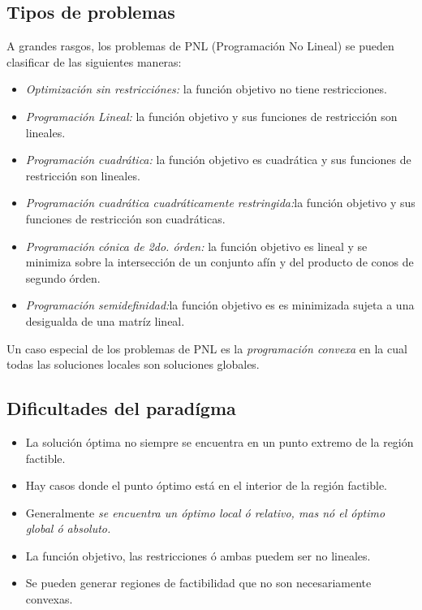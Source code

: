 \documentclass[letterpaper, 12pt]{article}
\begin{document}
    \subsection{Tipos de problemas}
    A grandes rasgos, los problemas de PNL (Programación No Lineal) se pueden clasificar de las siguientes maneras:
    \begin{itemize}
        \item \emph{Optimización sin restricciónes:} la función objetivo no tiene restricciones.
        \item \emph{Programación Lineal: }la función objetivo y sus funciones de restricción son lineales.
        \item \emph{Programación cuadrática: }la función objetivo es cuadrática y sus funciones de restricción son lineales.
        \item \emph{Programación cuadrática cuadráticamente restringida:}la función objetivo y sus funciones de restricción son cuadráticas.
        \item \emph{Programación cónica de 2do. órden: }la función objetivo es lineal y se minimiza sobre la intersección de un conjunto afín y del producto de conos de segundo órden.
        \item \emph{Programación semidefinidad:}la función objetivo es es minimizada sujeta a una desigualda de una matríz lineal.
    \end{itemize}
    Un caso especial de los problemas de PNL es la \emph{programación convexa} en la cual todas las soluciones locales son soluciones globales.
    \subsection{Dificultades del paradígma}
    \begin{itemize}
        \item La solución óptima no siempre se encuentra en un punto extremo de la región factible.
        \item Hay casos donde el punto óptimo está en el interior de la región factible.
        \item Generalmente \emph{se encuentra un óptimo local ó relativo, mas nó el óptimo global ó absoluto.}
        \item La función objetivo, las restricciones ó ambas puedem ser no lineales.
        \item Se pueden generar regiones de factibilidad que no son necesariamente convexas.
    \end{itemize}
\end{document}
